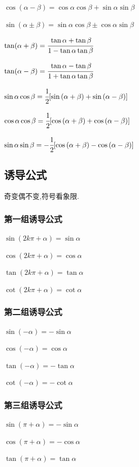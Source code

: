 \documentclass[UTF8,12pt]{ctexbook}
\begin{document}
{{{  $\cos(\alpha - \beta) = \cos{\alpha}\cos{\beta} + \sin{\alpha}\sin{\beta}$

  $\sin(\alpha \pm \beta) = \sin{\alpha}\cos{\beta} \pm \cos{\alpha}\sin{\beta}$

  $\tan(\alpha + \beta) = \cfrac{\tan\alpha + \tan\beta}{1 - \tan\alpha\tan\beta}$

  $\tan(\alpha - \beta) = \cfrac{\tan\alpha - \tan\beta}{1 + \tan\alpha\tan\beta}$

  $\sin{\alpha}\cos{\beta} = \cfrac{1}{2}[\sin{(\alpha + \beta)} + \sin{(\alpha - \beta)}]$

  $\cos{\alpha}\cos{\beta} = \cfrac{1}{2}[\cos{(\alpha + \beta)} + \cos{(\alpha - \beta)}]$

  $\sin{\alpha}\sin{\beta} = -\cfrac{1}{2}[\cos{(\alpha + \beta)} - \cos{(\alpha - \beta)}]$
}%

\subsection{诱导公式}{
  \indent 奇变偶不变,符号看象限.
  \subsubsection{第一组诱导公式}{
    $\sin{(2k\pi + \alpha)} = \sin{\alpha}$

    $\cos{(2k\pi + \alpha)} = \cos{\alpha}$

    $\tan(2k\pi + \alpha) = \tan\alpha$

    $\cot(2k\pi + \alpha) = \cot\alpha$
  }%

  \subsubsection{第二组诱导公式}{
    $\sin(-\alpha) = -\sin\alpha$

    $\cos(-\alpha) = \cos\alpha$

    $\tan(-\alpha) = -\tan\alpha$

    $\cot(-\alpha) = -\cot\alpha$
  }%

  \subsubsection{第三组诱导公式}{
    $\sin(\pi + \alpha) = -\sin\alpha$

    $\cos(\pi + \alpha) = -\cos\alpha$

    $\tan(\pi + \alpha) = \tan\alpha$

}}}}
\end{document}
